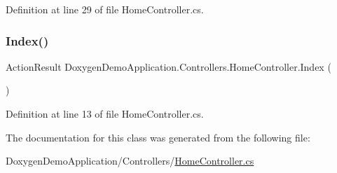 Definition at line 29 of file Home\+Controller.\+cs.

\mbox{\label{class_doxygen_demo_application_1_1_controllers_1_1_home_controller_a9c2494723fb0fbc42a3820972e2318c6}} 
\subsubsection{\texorpdfstring{Index()}{Index()}}
{\footnotesize\ttfamily Action\+Result Doxygen\+Demo\+Application.\+Controllers.\+Home\+Controller.\+Index (\begin{DoxyParamCaption}{ }\end{DoxyParamCaption})}



Definition at line 13 of file Home\+Controller.\+cs.



The documentation for this class was generated from the following file\+:\begin{DoxyCompactItemize}
\item 
Doxygen\+Demo\+Application/\+Controllers/\mbox{\hyperlink{_home_controller_8cs}{Home\+Controller.\+cs}}\end{DoxyCompactItemize}
